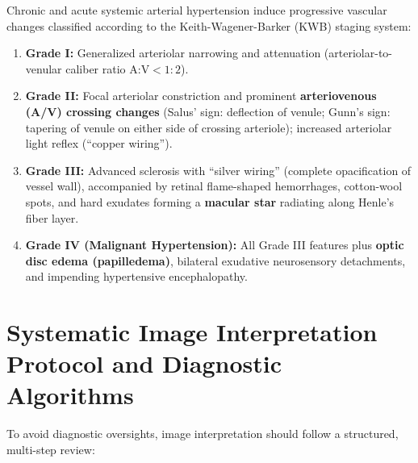 \documentclass[11pt,a4paper]{article}
\begin{document}
Chronic and acute systemic arterial hypertension induce progressive vascular changes classified according to the Keith-Wagener-Barker (KWB) staging system:
\begin{enumerate}[leftmargin=*]
    \item \textbf{Grade I:} Generalized arteriolar narrowing and attenuation (arteriolar-to-venular caliber ratio $\text{A:V} < 1:2$).
    \item \textbf{Grade II:} Focal arteriolar constriction and prominent \textbf{arteriovenous (A/V) crossing changes} (Salus' sign: deflection of venule; Gunn's sign: tapering of venule on either side of crossing arteriole); increased arteriolar light reflex (``copper wiring'').
    \item \textbf{Grade III:} Advanced sclerosis with ``silver wiring'' (complete opacification of vessel wall), accompanied by retinal flame-shaped hemorrhages, cotton-wool spots, and hard exudates forming a \textbf{macular star} radiating along Henle's fiber layer.
    \item \textbf{Grade IV (Malignant Hypertension):} All Grade III features plus \textbf{optic disc edema (papilledema)}, bilateral exudative neurosensory detachments, and impending hypertensive encephalopathy.
\end{enumerate}

\section{Systematic Image Interpretation Protocol and Diagnostic Algorithms}

To avoid diagnostic oversights, image interpretation should follow a structured, multi-step review:
\end{document}
